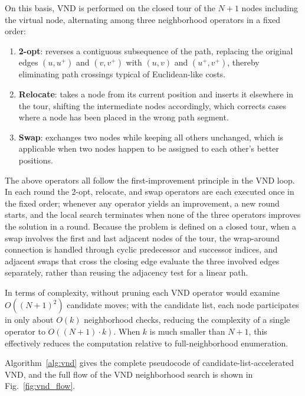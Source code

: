 \documentclass[pdflatex,sn-basic,Numbered]{sn-jnl}
\begin{document}
On this basis, VND is performed on the closed tour of the $N+1$ nodes including the virtual node, alternating among three neighborhood operators in a fixed order:
\begin{enumerate}
\item \textbf{2-opt}: reverses a contiguous subsequence of the path, replacing the original edges $(u, u^{+})$ and $(v, v^{+})$ with $(u, v)$ and $(u^{+}, v^{+})$, thereby eliminating path crossings typical of Euclidean-like costs.
\item \textbf{Relocate}: takes a node from its current position and inserts it elsewhere in the tour, shifting the intermediate nodes accordingly, which corrects cases where a node has been placed in the wrong path segment.
\item \textbf{Swap}: exchanges two nodes while keeping all others unchanged, which is applicable when two nodes happen to be assigned to each other's better positions.
\end{enumerate}
The above operators all follow the first-improvement principle in the VND loop. In each round the 2-opt, relocate, and swap operators are each executed once in the fixed order; whenever any operator yields an improvement, a new round starts, and the local search terminates when none of the three operators improves the solution in a round. Because the problem is defined on a closed tour, when a swap involves the first and last adjacent nodes of the tour, the wrap-around connection is handled through cyclic predecessor and successor indices, and adjacent swaps that cross the closing edge evaluate the three involved edges separately, rather than reusing the adjacency test for a linear path.

In terms of complexity, without pruning each VND operator would examine $O((N+1)^2)$ candidate moves; with the candidate list, each node participates in only about $O(k)$ neighborhood checks, reducing the complexity of a single operator to $O((N+1)\cdot k)$. When $k$ is much smaller than $N+1$, this effectively reduces the computation relative to full-neighborhood enumeration.

Algorithm~\ref{alg:vnd} gives the complete pseudocode of candidate-list-accelerated VND, and the full flow of the VND neighborhood search is shown in Fig.~\ref{fig:vnd_flow}.
\end{document}
